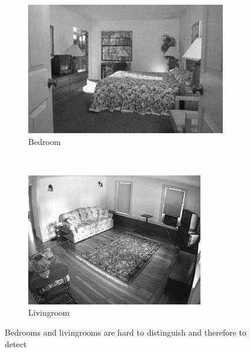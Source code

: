 \documentclass[subfigure,epsfig,fleqn,float,numbers=noenddot]{scrartcl}
\begin{document}
\begin{figure}%
	\centering
	\begin{subfigure}[b]{0.4\textwidth}
					\includegraphics[width=\textwidth]{img/bedroom_hard}
					\caption{Bedroom}
					\label{fig:bedroomhad}
	\end{subfigure}%
	~ %
	\begin{subfigure}[b]{0.4\textwidth}
					\includegraphics[width=\textwidth]{img/livingroom_hard}
					\caption{Livingroom}
					\label{fig:livingroomhard}
	\end{subfigure}
	\caption{Bedrooms and livingrooms are hard to distinguish and therefore to detect}
	\label{fig:hardimages}
\end{figure}
\end{document}
